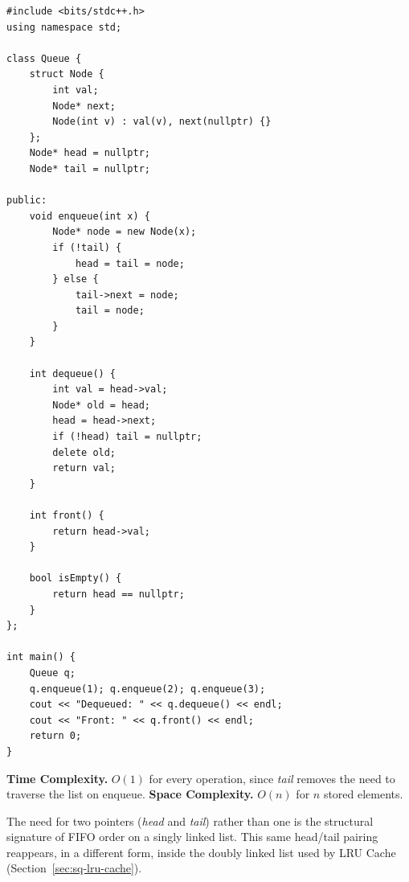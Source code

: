 \begin{lstlisting}
#include <bits/stdc++.h>
using namespace std;

class Queue {
    struct Node {
        int val;
        Node* next;
        Node(int v) : val(v), next(nullptr) {}
    };
    Node* head = nullptr;
    Node* tail = nullptr;

public:
    void enqueue(int x) {
        Node* node = new Node(x);
        if (!tail) {
            head = tail = node;
        } else {
            tail->next = node;
            tail = node;
        }
    }

    int dequeue() {
        int val = head->val;
        Node* old = head;
        head = head->next;
        if (!head) tail = nullptr;
        delete old;
        return val;
    }

    int front() {
        return head->val;
    }

    bool isEmpty() {
        return head == nullptr;
    }
};

int main() {
    Queue q;
    q.enqueue(1); q.enqueue(2); q.enqueue(3);
    cout << "Dequeued: " << q.dequeue() << endl;
    cout << "Front: " << q.front() << endl;
    return 0;
}
\end{lstlisting}

\begin{complexitybox}
\textbf{Time Complexity.} $O(1)$ for every operation, since \textit{tail}
removes the need to traverse the list on enqueue.
\textbf{Space Complexity.} $O(n)$ for $n$ stored elements.
\end{complexitybox}

\begin{takeawaybox}
The need for two pointers (\textit{head} and \textit{tail}) rather than
one is the structural signature of FIFO order on a singly linked list.
This same head/tail pairing reappears, in a different form, inside the
doubly linked list used by LRU Cache (Section~\ref{sec:sq-lru-cache}).
\end{takeawaybox}
